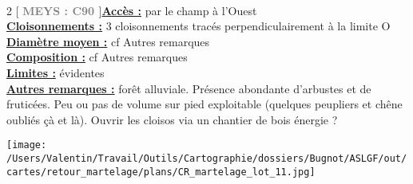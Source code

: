 \documentclass[a4paper,openany]{book}\usepackage[]{graphicx}\usepackage[]{color}
\begin{document}
\\\begin{multicols}{2}
[
\textbf{\textcolor{gray}{
\large MEYS : C90
}}
]\noindent\textbf{\underline{Accès :}} par le champ à l'Ouest\vspace{0.1cm} \\\noindent\textbf{\underline{Cloisonnements :}} 3 cloisonnements tracés perpendiculairement à la limite O\vspace{0.1cm} \\\noindent\textbf{\underline{Diamètre moyen :}} cf Autres remarques\vspace{0.1cm} \\\noindent\textbf{\underline{Composition :}} cf Autres remarques\vspace{0.1cm} \\\noindent\textbf{\underline{Limites :}} évidentes\vspace{0.1cm} \\\noindent\textbf{\underline{Autres remarques :}} forêt alluviale. Présence abondante d'arbustes et de fruticées. Peu ou pas de volume sur pied exploitable (quelques peupliers et chêne oubliés çà et là). Ouvrir les cloisos via un chantier de bois énergie ?\vspace{0.1cm} \\\end{multicols}\begin{center}
\texttt{[image: /Users/Valentin/Travail/Outils/Cartographie/dossiers/Bugnot/ASLGF/out/cartes/retour\_martelage/plans/CR\_martelage\_lot\_11.jpg]}
\end{center}\newpage\noindent
\end{document}
